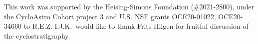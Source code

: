 \documentclass[]{agujournal2019}
\begin{document}
This work was supported by the Heising-Simons Foundation (\#2021-2800), under the CycloAstro
Cohort project 3 and U.S. NSF grants OCE20-01022, OCE20-34660 to R.E.Z.
I.J.K.\ would like to thank Frits Hilgen for fruitful discussion of the cyclostratigraphy.


%
%






%
%
%
%
%
\end{document}
